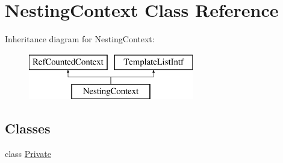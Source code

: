 \hypertarget{class_nesting_context}{}\section{Nesting\+Context Class Reference}
\label{class_nesting_context}
Inheritance diagram for Nesting\+Context\+:\begin{figure}[H]
\begin{center}
\leavevmode
\includegraphics[height=2.000000cm]{class_nesting_context}
\end{center}
\end{figure}
\subsection*{Classes}
\begin{DoxyCompactItemize}
\item 
class \mbox{\hyperlink{class_nesting_context_1_1_private}{Private}}
\end{DoxyCompactItemize}
